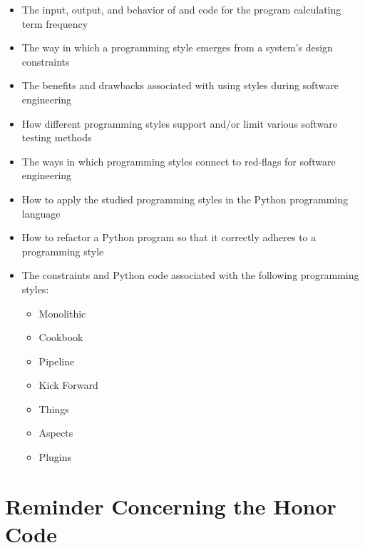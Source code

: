 \documentclass[11pt]{article}
\begin{document}
\begin{itemize}
\begin{itemize}
      \item The input, output, and behavior of and code for the program
        calculating term frequency

      \item The way in which a programming style emerges from a system's design constraints

      \item The benefits and drawbacks associated with using styles during
        software engineering

      \item How different programming styles support and/or limit various
        software testing methods

      \item The ways in which programming styles connect to red-flags for
        software engineering

      \item How to apply the studied programming styles in the Python
        programming language

      \item How to refactor a Python program so that it correctly adheres to a
        programming style

      \item The constraints and Python code associated with the following
        programming styles:

        \begin{itemize}
          \itemsep 0.025in
          \item Monolithic
          \item Cookbook
          \item Pipeline
          \item Kick Forward
          \item Things
          \item Aspects
          \item Plugins
        \end{itemize}

    \end{itemize}

\end{itemize}

\section*{Reminder Concerning the Honor Code}

\vspace*{-.025in}
\end{document}
